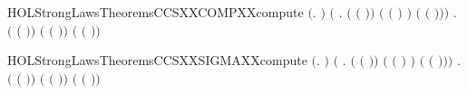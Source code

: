 \begin{SaveVerbatim}{HOLStrongLawsTheoremsCCSXXCOMPXXcompute}
\HOLTokenTurnstile{} \ensuremath{(}\HOLSymConst{\HOLTokenForall{}}.    \HOLSymConst{\ensuremath{=}}  \ensuremath{)} \HOLSymConst{\HOLTokenConj{}}
   \ensuremath{(}\HOLSymConst{\HOLTokenForall{}} .
        \ensuremath{(} \ensuremath{(} \ensuremath{)}\ensuremath{)} \HOLSymConst{\ensuremath{=}}
        \ensuremath{(} \ensuremath{(} \ensuremath{)} \HOLSymConst{\ensuremath{-}} \ensuremath{)} \HOLSymConst{\ensuremath{\mid}}  \ensuremath{(} \ensuremath{(} \ensuremath{)}\ensuremath{)}\ensuremath{)} \HOLSymConst{\HOLTokenConj{}}
   \HOLSymConst{\HOLTokenForall{}} .
       \ensuremath{(} \ensuremath{(} \ensuremath{)}\ensuremath{)} \HOLSymConst{\ensuremath{=}}
       \ensuremath{(} \ensuremath{(} \ensuremath{)}\ensuremath{)} \HOLSymConst{\ensuremath{\mid}}  \ensuremath{(} \ensuremath{(} \ensuremath{)}\ensuremath{)}
\end{SaveVerbatim}
\newcommand{\HOLStrongLawsTheoremsCCSXXCOMPXXcompute}{\UseVerbatim{HOLStrongLawsTheoremsCCSXXCOMPXXcompute}}
\begin{SaveVerbatim}{HOLStrongLawsTheoremsCCSXXSIGMAXXcompute}
\HOLTokenTurnstile{} \ensuremath{(}\HOLSymConst{\HOLTokenForall{}}. \HOLConst{\HOLTokenSum{}}   \HOLSymConst{\ensuremath{=}}  \ensuremath{)} \HOLSymConst{\HOLTokenConj{}}
   \ensuremath{(}\HOLSymConst{\HOLTokenForall{}} .
      \HOLConst{\HOLTokenSum{}}  \ensuremath{(} \ensuremath{(} \ensuremath{)}\ensuremath{)} \HOLSymConst{\ensuremath{=}}
      \HOLConst{\HOLTokenSum{}}  \ensuremath{(} \ensuremath{(} \ensuremath{)} \HOLSymConst{\ensuremath{-}} \ensuremath{)} \HOLSymConst{\ensuremath{+}}  \ensuremath{(} \ensuremath{(} \ensuremath{)}\ensuremath{)}\ensuremath{)} \HOLSymConst{\HOLTokenConj{}}
   \HOLSymConst{\HOLTokenForall{}} .
     \HOLConst{\HOLTokenSum{}}  \ensuremath{(} \ensuremath{(} \ensuremath{)}\ensuremath{)} \HOLSymConst{\ensuremath{=}}
     \HOLConst{\HOLTokenSum{}}  \ensuremath{(} \ensuremath{(} \ensuremath{)}\ensuremath{)} \HOLSymConst{\ensuremath{+}}  \ensuremath{(} \ensuremath{(} \ensuremath{)}\ensuremath{)}
\end{SaveVerbatim}

